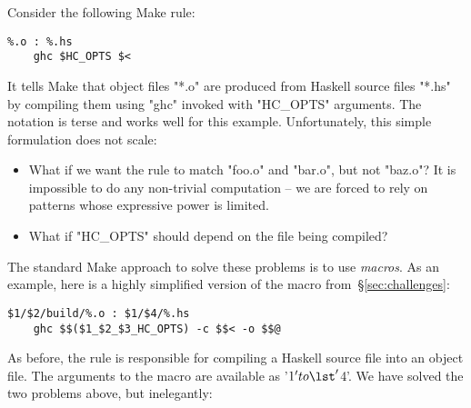 Consider the following Make rule:

\begin{lstlisting}
%.o : %.hs
    ghc $HC_OPTS $<
\end{lstlisting}

\noindent It tells Make that object files \lst"*.o" are produced from Haskell
source files \lst"*.hs" by compiling them using \lst"ghc" invoked with
\lst"HC_OPTS" arguments. The notation is terse and works well for this example.
Unfortunately, this simple formulation does not scale:

\begin{itemize}
\item What if we want the rule to match \lst"foo.o" and \lst"bar.o", but not
\lst"baz.o"? It is impossible to do any non-trivial computation -- we are forced
to rely on patterns whose expressive power is limited.
\item What if \lst"HC_OPTS" should depend on the file being compiled?
\end{itemize}

The standard Make approach to solve these problems is to use \emph{macros}.
As an example, here is a highly simplified version of the macro from~\S\ref{sec:challenges}:

\begin{lstlisting}
$1/$2/build/%.o : $1/$4/%.hs
    ghc $$($1_$2_$3_HC_OPTS) -c $$< -o $$@
\end{lstlisting}

\noindent As before, the rule is responsible for compiling a Haskell source
file into an object file. The arguments to the macro are available as \lst'$1'
to \lst'$4'. We have solved the two problems above, but inelegantly:


